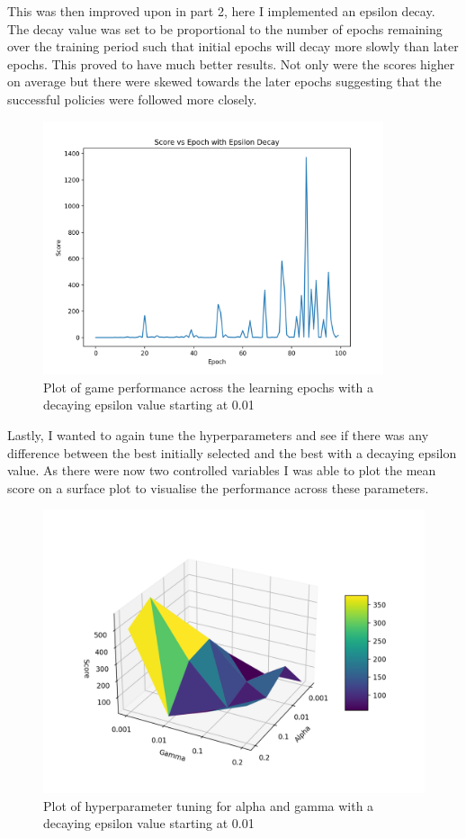 \documentclass[submit]{harvardml}
\begin{document}
This was then improved upon in part 2, here I implemented an epsilon decay. The decay value was set to be proportional to the number of epochs remaining over the training period such that initial epochs will decay more slowly than later epochs. This proved to have much better results. Not only were the scores higher on average but there were skewed towards the later epochs suggesting that the successful policies were followed more closely.

\begin{figure}[H]
    \includegraphics[width=10cm]{hw6/T6_P3/plots/p3_a.png}
    \centering
    \caption{Plot of game performance across the learning epochs with a decaying epsilon value starting at 0.01}
\end{figure}

Lastly, I wanted to again tune the hyperparameters and see if there was any difference between the best initially selected and the best with a decaying epsilon value. As there were now two controlled variables I was able to plot the mean score on a surface plot to visualise the performance across these parameters.

\begin{figure}[H]
    \includegraphics[width=12cm]{hw6/T6_P3/plots/p3_c.png}
    \centering
    \caption{Plot of hyperparameter tuning for alpha and gamma with a decaying epsilon value starting at 0.01}
\end{figure}
\end{document}
